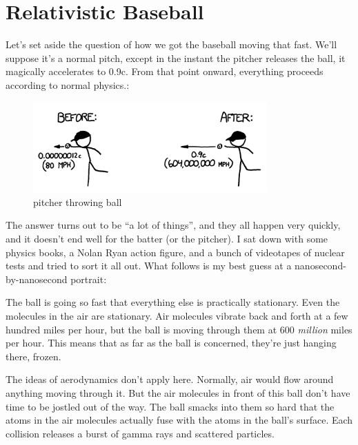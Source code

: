 {
\chapter{Relativistic Baseball}
}

\hfill{}

{Let’s set aside the question of how we got the baseball moving that fast. We'll suppose it's a normal pitch, except in the instant the pitcher releases the ball, it magically accelerates to 0.9c. From that point onward, everything proceeds according to normal physics.:}

\begin{figure}[!htbp]
\centering
\includegraphics[scale=0.5, max width=0.8\textwidth]{imgs/a/1/01.png}
\caption{pitcher throwing ball}
\end{figure}

{The answer turns out to be “a lot of things”, and they all happen very quickly, and it doesn’t end well for the batter (or the pitcher). I sat down with some physics books, a Nolan Ryan action figure, and a bunch of videotapes of nuclear tests and tried to sort it all out. What follows is my best guess at a nanosecond-by-nanosecond portrait:}

{The ball is going so fast that everything else is practically stationary. Even the molecules in the air are stationary. Air molecules vibrate back and forth at a few hundred miles per hour, but the ball is moving through them at 600 \emph{million} miles per hour. This means that as far as the ball is concerned, they’re just hanging there, frozen.}

{The ideas of aerodynamics don’t apply here. Normally, air would flow around anything moving through it. But the air molecules in front of this ball don’t have time to be jostled out of the way. The ball smacks into them so hard that the atoms in the air molecules actually fuse with the atoms in the ball’s surface. Each collision releases a burst of gamma rays and scattered particles.}

